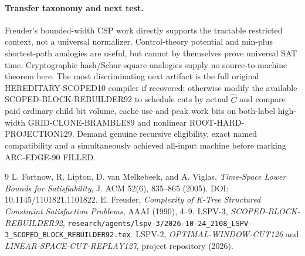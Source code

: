 \documentclass[11pt]{article}
\begin{document}
\paragraph{Transfer taxonomy and next test.}
Freuder's bounded-width CSP work directly supports the tractable restricted context, not a universal normalizer. Control-theory potential and min-plus shortest-path analogies are useful, but cannot by themselves prove universal SAT time. Cryptographic hash/Schur-square analogies supply no source-to-machine theorem here. The most discriminating next artifact is the full original HEREDITARY-SCOPED10 compiler if recovered; otherwise modify the available SCOPED-BLOCK-REBUILDER92 to schedule cuts by actual \(\widehat C\) and compare paid ordinary child bit volume, cache use and peak work bits on both-label high-width GRID-CLONE-BRAMBLE89 and nonlinear ROOT-HARD-PROJECTION129. Demand genuine recursive eligibility, exact named compatibility and a simultaneously achieved all-input machine before marking ARC-EDGE-90 FILLED.

\begin{thebibliography}{9}
 L. Fortnow, R. Lipton, D. van Melkebeek, and A. Viglas, \emph{Time-Space Lower Bounds for Satisfiability}, J. ACM 52(6), 835--865 (2005). DOI: 10.1145/1101821.1101822.
 E. Freuder, \emph{Complexity of K-Tree Structured Constraint Satisfaction Problems}, AAAI (1990), 4--9.
 LSPV-3, \emph{SCOPED-BLOCK-REBUILDER92}, \texttt{research/agents/lspv-3/2026-10-24\_2108\_LSPV-3\_SCOPED\_BLOCK\_REBUILDER92.tex}.
 LSPV-2, \emph{OPTIMAL-WINDOW-CUT126} and \emph{LINEAR-SPACE-CUT-REPLAY127}, project repository (2026).
\end{thebibliography}
\end{document}

